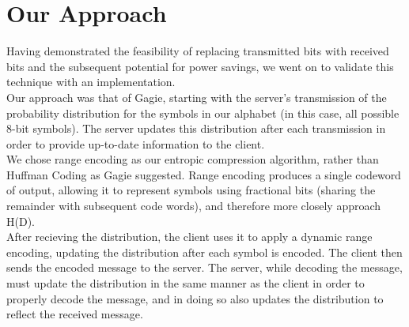 \section{Our Approach}

Having demonstrated the feasibility of replacing transmitted bits with
received bits and the subsequent potential for power savings, we went
on to validate this technique with an implementation.\\

Our approach was that of Gagie, starting with the server's
transmission of the probability distribution for the symbols in our
alphabet (in this case, all possible 8-bit symbols).  The server
updates this distribution after each transmission in order to provide
up-to-date information to the client.\\

We chose range encoding as our entropic compression algorithm, rather
than Huffman Coding as Gagie suggested.  Range encoding produces a
single codeword of output, allowing it to represent symbols using
fractional bits (sharing the remainder with subsequent code words),
and therefore more closely approach H(D).\\

After recieving the distribution, the client uses it to apply a
dynamic range encoding, updating the distribution after each symbol is
encoded. The client then sends the encoded message to the server.  The
server, while decoding the message, must update the distribution in
the same manner as the client in order to properly decode the message,
and in doing so also updates the distribution to reflect the received
message.\\


